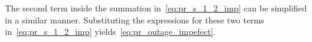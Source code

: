 \documentclass[12pt,draftcls,peerreview,onecolumn]{IEEEtran}
\begin{document}
The second term inside the summation in~\eqref{eq:pr_s_1_2_imp} can be simplified in a similar manner. Substituting the expressions for these two terms in~\eqref{eq:pr_s_1_2_imp} yields~\eqref{eq:pr_outage_impefect}.
 


%



%
\end{document}
